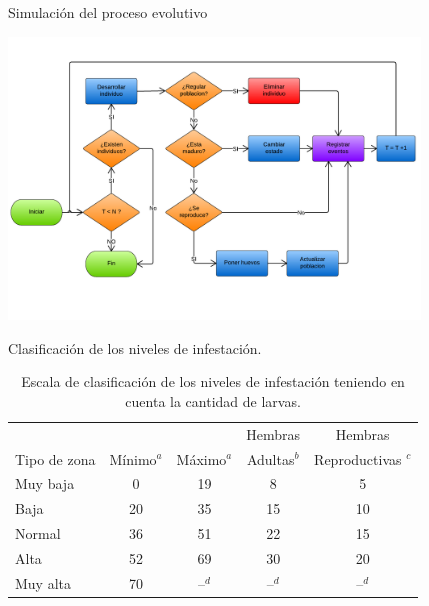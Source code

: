 \begin{frame}[c]{Simulación del proceso evolutivo}
  \begin{center}
    \includegraphics[height=7.5cm]{./graphics/algoritmo-propuesto.png}
  \end{center}
\end{frame}


\begin{frame}[c]{Clasificación de los niveles de infestación.}
  \begin{table}
    \begin{minipage}{\textwidth}
    \begin{center}
    \caption{\label{tab:cap4-puntaje-zona} Escala de clasificación de los niveles de infestación teniendo en cuenta la cantidad de larvas.}
      \begin{tabular}{l c c c c}
          \hline
                       &          &           & Hembras     & Hembras \\
          Tipo de zona &Mínimo$^a$& Máximo$^a$& Adultas$^b$ & Reproductivas $^c$\\
          \hline
          \hline
          Muy baja  & 0  & 19 & 8  & 5 \\
          Baja    & 20 & 35 & 15 & 10\\
          Normal & 36 & 51 & 22 & 15\\
          Alta   & 52 & 69 & 30 & 20\\
          Muy alta  & 70 & --$^d$  & --$^d$  & --$^d$ \\
      \end{tabular}
      \end{center}
    \end{minipage}
  \end{table}
\end{frame}


